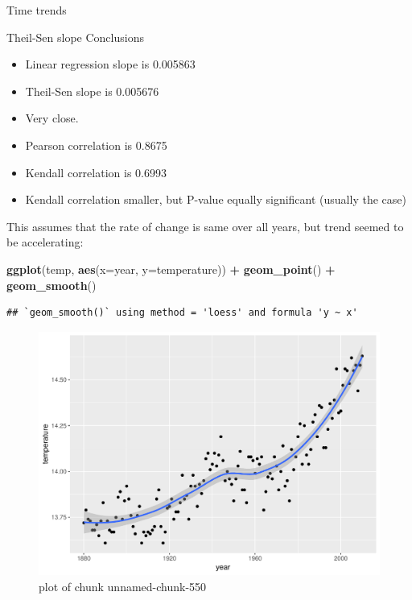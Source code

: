 \documentclass[ignorenonframetext,]{beamer}
\newenvironment{Shaded}{\begin{snugshade}}{\end{snugshade}}
\newcommand{\DataTypeTok}[1]{\textcolor[rgb]{0.13,0.29,0.53}{#1}}
\newcommand{\KeywordTok}[1]{\textcolor[rgb]{0.13,0.29,0.53}{\textbf{#1}}}
\newcommand{\NormalTok}[1]{#1}
\newcommand{\OperatorTok}[1]{\textcolor[rgb]{0.81,0.36,0.00}{\textbf{#1}}}
\newcommand{\StringTok}[1]{\textcolor[rgb]{0.31,0.60,0.02}{#1}}
\providecommand{\tightlist}{%
  \setlength{\itemsep}{0pt}\setlength{\parskip}{0pt}}
\begin{document}
\begin{frame}[fragile]{Time trends}
\begin{block}{Theil-Sen slope}
Conclusions

\begin{itemize}
\tightlist
\item
  Linear regression slope is 0.005863
\item
  Theil-Sen slope is 0.005676
\item
  Very close.
\item
  Pearson correlation is 0.8675
\item
  Kendall correlation is 0.6993
\item
  Kendall correlation smaller, but P-value equally significant (usually
  the case)
\end{itemize}

This assumes that the rate of change is same over all years, but trend
seemed to be accelerating:

\begin{Shaded}
\begin{Highlighting}[]
\KeywordTok{ggplot}\NormalTok{(temp, }\KeywordTok{aes}\NormalTok{(}\DataTypeTok{x=}\NormalTok{year, }\DataTypeTok{y=}\NormalTok{temperature)) }\OperatorTok{+}\StringTok{ }\KeywordTok{geom_point}\NormalTok{() }\OperatorTok{+}\StringTok{ }\KeywordTok{geom_smooth}\NormalTok{()}
\end{Highlighting}
\end{Shaded}

\begin{verbatim}
## `geom_smooth()` using method = 'loess' and formula 'y ~ x'
\end{verbatim}

\begin{figure}
\centering
\includegraphics{figure/unnamed-chunk-550-1.pdf}
\caption{plot of chunk unnamed-chunk-550}
\end{figure}


\end{block}
\end{frame}
\end{document}

